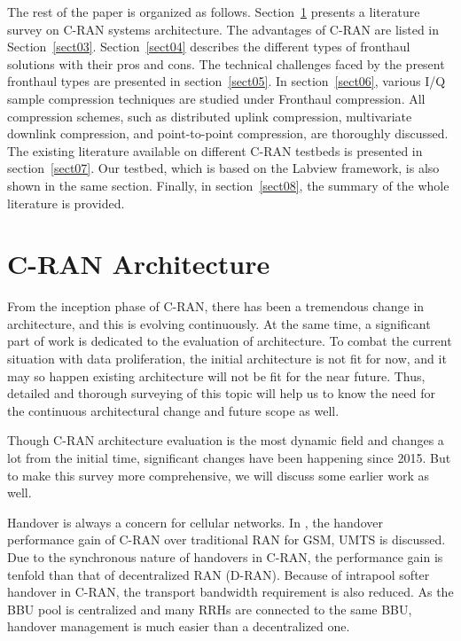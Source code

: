 \begin{multicols}{2}
The rest of the paper is organized as follows. Section~\ref{sect02} presents a literature survey on C-RAN systems architecture. The advantages of C-RAN are listed in Section~\ref{sect03}. Section~\ref{sect04} describes the different types of fronthaul solutions with their pros and cons. The technical challenges faced by the present fronthaul types are presented in section~\ref{sect05}. In section~\ref{sect06}, various I/Q sample compression techniques are studied under Fronthaul compression. All compression schemes, such as distributed uplink compression, multivariate downlink compression, and point-to-point compression, are thoroughly discussed. The existing literature available on different C-RAN testbeds is presented in section~\ref{sect07}. Our testbed, which is based on the Labview framework, is also shown in the same section. Finally, in section~\ref{sect08}, the summary of the whole literature is provided.

\section{C-RAN Architecture}\label{sect02}

From the inception phase of C-RAN, there has been a tremendous change in architecture, and this is evolving continuously. At the same time, a significant part of work is dedicated to the evaluation of architecture. To combat the current situation with data proliferation, the initial architecture is not fit for now, and it may so happen existing architecture will not be fit for the near future. Thus, detailed and thorough surveying of this topic will help us to know the need for the continuous architectural change and future scope as well.

Though C-RAN architecture evaluation is the most dynamic field and changes a lot from the initial time, significant changes have been happening since 2015. But to make this survey more comprehensive, we will discuss some earlier work as well.

Handover is always a concern for cellular networks. In \cite{art3-key13}, the handover performance gain of C-RAN over traditional RAN for GSM, UMTS is discussed. Due to the synchronous nature of handovers in C-RAN, the performance gain is tenfold than that of decentralized RAN (D-RAN). Because of intrapool softer handover in C-RAN, the transport bandwidth requirement is also reduced. As the BBU pool is centralized and many RRHs are connected to the same BBU, handover management is much easier than a decentralized one.


\end{multicols}
